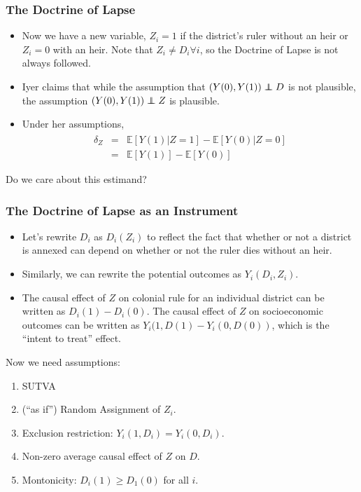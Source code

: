 \documentclass{beamer}
\newcommand\independent{\protect\mathpalette{\protect\independenT}{\perp}}
\def\independenT#1#2{\mathrel{\rlap{$#1#2$}\mkern2mu{#1#2}}}
\begin{document}
   \begin{frame}
     \frametitle{The Doctrine of Lapse}
     \begin{itemize}
     \item Now we have a new variable,   $Z_i=1$ if the district's
       ruler without an heir or  $Z_i=0$ with an heir. Note that $Z_i \neq D_i
       \forall i$, so the Doctrine of Lapse is not always followed. 
     \item Iyer claims that while the assumption that
       $(Y(0),Y(1))\independent D$ is not plausible, the assumption
       $(Y(0),Y(1))\independent Z$ is plausible.
     \item Under her assumptions,
\begin{eqnarray*}
\hat \delta_Z & =&\mathbb{E}[Y(1)|Z=1] - \mathbb{E}[Y(0)|Z=0]  \\
&=&\mathbb{E}[Y(1)] - \mathbb{E}[Y(0)] 
\end{eqnarray*}
     \end{itemize}
Do we care about this estimand? 
\end{frame}

\begin{frame}
  \frametitle{The Doctrine of Lapse as an Instrument}
  \begin{itemize}
  \item Let's rewrite $D_i$ as $D_i(Z_i)$ to reflect the fact that
    whether or not a district is annexed can depend on whether or not
    the ruler dies without an heir.
  \item Similarly, we can rewrite the potential outcomes as
    $Y_i(D_i,Z_i)$.
  \item The causal effect of $Z$ on colonial rule for an individual
    district can be written as $D_i(1)-D_i(0)$. The causal effect of
    $Z$ on socioeconomic outcomes can be written as
    $Y_i(1,D(1)-Y_i(0,D(0))$, which is the ``intent to treat''
    effect. 
  \end{itemize}
Now we need assumptions:
  \begin{enumerate}
  \item SUTVA
  \item (``as if'') Random Assignment of $Z_i$.
  \item Exclusion restriction: $Y_i(1, D_i)=Y_i(0,D_i)$.
  \item Non-zero average causal effect of $Z$ on $D$.
  \item Montonicity: $D_i(1) \geq D_1(0)$ for all $i$.
  \end{enumerate}
\end{frame}
\end{document}
